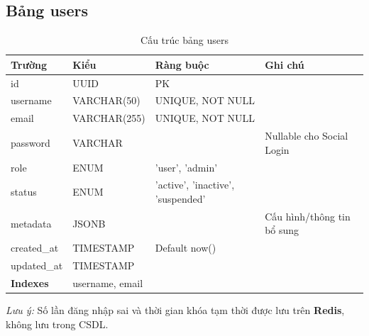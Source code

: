 \documentclass[12pt,a4paper]{article}
\begin{document}
\subsection{Bảng users}
\begin{longtable}{|l|l|l|p{5cm}|}
    \caption{Cấu trúc bảng users}                                                          \\
    \hline
    \rowcolor{headerblue}
    \textbf{Trường} & \textbf{Kiểu} & \textbf{Ràng buộc}                & \textbf{Ghi chú} \\
    \hline
    id              & UUID          & PK                                &                  \\
    \hline
    username        & VARCHAR(50)   & UNIQUE, NOT NULL                  &                  \\
    \hline
    email           & VARCHAR(255)  & UNIQUE, NOT NULL                  &                  \\
    \hline
    password        & VARCHAR       &                                   & Nullable cho Social Login \\
    \hline
    role            & ENUM          & 'user', 'admin'                   &                  \\
    \hline
    status          & ENUM          & 'active', 'inactive', 'suspended' &                  \\
    \hline
    metadata        & JSONB         &                                   & Cấu hình/thông tin bổ sung \\
    \hline
    created\_at     & TIMESTAMP     & Default now()                     &                  \\
    \hline
    updated\_at     & TIMESTAMP     &                                   &                  \\
    \hline
    \rowcolor{headerblue}
    \textbf{Indexes} & \multicolumn{3}{l|}{username, email}                                \\
    \hline
\end{longtable}

\textit{Lưu ý:} Số lần đăng nhập sai và thời gian khóa tạm thời được lưu trên \textbf{Redis}, không lưu trong CSDL.
\end{document}

